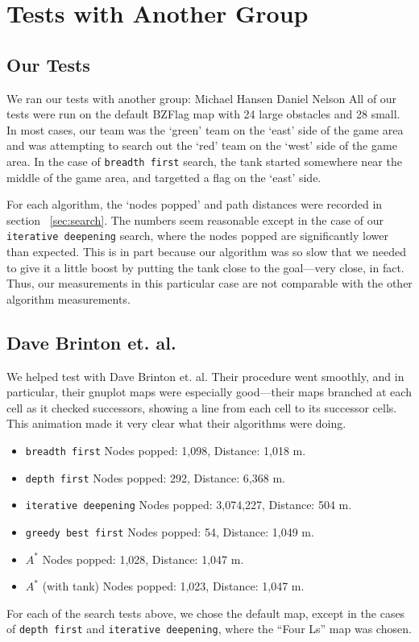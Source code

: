 \section{Tests with Another Group}
\subsection{Our Tests}
We ran our tests with another group:
Michael Hansen
Daniel Nelson
All of our tests were run on the default BZFlag map with 24 large obstacles and 28 small.  In most cases, our team was the `green' team on the `east' side of the game area and was attempting to search out the `red' team on the `west' side of the game area.  In the case of \texttt{breadth first} search, the tank started somewhere near the middle of the game area, and targetted a flag on the `east' side.
\par
For each algorithm, the `nodes popped' and path distances were recorded in section ~\ref{sec:search}.  The numbers seem reasonable except in the case of our \texttt{iterative deepening} search, where the nodes popped are significantly lower than expected.  This is in part because our algorithm was so slow that we needed to give it a little boost by putting the tank close to the goal---very close, in fact.  Thus, our measurements in this particular case are not comparable with the other algorithm measurements.

\subsection{Dave Brinton et. al.}
We helped test with Dave Brinton et. al.  Their procedure went smoothly, and in particular, their gnuplot maps were especially good---their maps branched at each cell as it checked successors, showing a line from each cell to its successor cells.  This animation made it very clear what their algorithms were doing.
\par

\begin{itemize}
    \item \texttt{breadth first}	Nodes popped: 1,098, Distance: 1,018 m.
    \item \texttt{depth first}	Nodes popped: 292, Distance: 6,368 m.
    \item \texttt{iterative deepening}	Nodes popped: 3,074,227, Distance: 504 m.
    \item \texttt{greedy best first}	Nodes popped: 54, Distance: 1,049 m.
    \item $A^*$	Nodes popped: 1,028, Distance: 1,047 m.
    \item $A^*$ (with tank) Nodes popped: 1,023, Distance: 1,047 m.
\end{itemize}

For each of the search tests above, we chose the default map, except in the cases of \texttt{depth first} and \texttt{iterative deepening}, where the ``Four Ls'' map was chosen.







